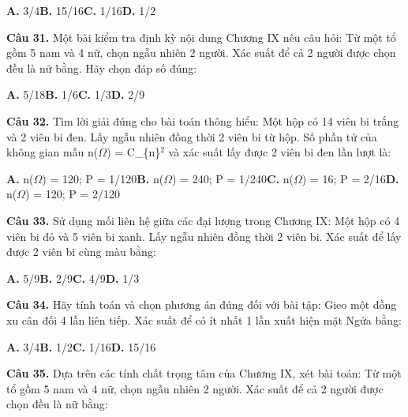 \documentclass[11pt,a4paper]{article}
\begin{document}
\hspace*{1.5em}\textbf{A.} 3/4\quad\quad \textbf{B.} 15/16\quad\quad \textbf{C.} 1/16\quad\quad \textbf{D.} 1/2\par\vspace{2pt}
\textbf{\color{primary} Câu 31.} Một bài kiểm tra định kỳ nội dung Chương IX nêu câu hỏi: Từ một tổ gồm 5 nam và 4 nữ, chọn ngẫu nhiên 2 người. Xác suất để cả 2 người được chọn đều là nữ bằng. Hãy chọn đáp số đúng:\par
\hspace*{1.5em}\textbf{A.} 5/18\quad\quad \textbf{B.} 1/6\quad\quad \textbf{C.} 1/3\quad\quad \textbf{D.} 2/9\par\vspace{2pt}
\textbf{\color{primary} Câu 32.} Tìm lời giải đúng cho bài toán thông hiểu: Một hộp có 14 viên bi trắng và 2 viên bi đen. Lấy ngẫu nhiên đồng thời 2 viên bi từ hộp. Số phần tử của không gian mẫu n($\Omega$) = C\_\{n\}$^{2}$ và xác suất lấy được 2 viên bi đen lần lượt là:\par
\hspace*{1.5em}\textbf{A.} n($\Omega$) = 120; P = 1/120\quad\quad \textbf{B.} n($\Omega$) = 240; P = 1/240\quad\quad \textbf{C.} n($\Omega$) = 16; P = 2/16\quad\quad \textbf{D.} n($\Omega$) = 120; P = 2/120\par\vspace{2pt}
\textbf{\color{primary} Câu 33.} Sử dụng mối liên hệ giữa các đại lượng trong Chương IX: Một hộp có 4 viên bi đỏ và 5 viên bi xanh. Lấy ngẫu nhiên đồng thời 2 viên bi. Xác suất để lấy được 2 viên bi cùng màu bằng:\par
\hspace*{1.5em}\textbf{A.} 5/9\quad\quad \textbf{B.} 2/9\quad\quad \textbf{C.} 4/9\quad\quad \textbf{D.} 1/3\par\vspace{2pt}
\textbf{\color{primary} Câu 34.} Hãy tính toán và chọn phương án đúng đối với bài tập: Gieo một đồng xu cân đối 4 lần liên tiếp. Xác suất để có ít nhất 1 lần xuất hiện mặt Ngửa bằng:\par
\hspace*{1.5em}\textbf{A.} 3/4\quad\quad \textbf{B.} 1/2\quad\quad \textbf{C.} 1/16\quad\quad \textbf{D.} 15/16\par\vspace{2pt}
\textbf{\color{primary} Câu 35.} Dựa trên các tính chất trọng tâm của Chương IX, xét bài toán: Từ một tổ gồm 5 nam và 4 nữ, chọn ngẫu nhiên 2 người. Xác suất để cả 2 người được chọn đều là nữ bằng:\par
\end{document}
